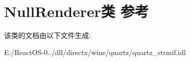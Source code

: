 \hypertarget{class_null_renderer}{}\section{Null\+Renderer类 参考}
\label{class_null_renderer}


该类的文档由以下文件生成\+:\begin{DoxyCompactItemize}
\item 
E\+:/\+React\+O\+S-\/0../dll/directx/wine/quartz/quartz\+\_\+strmif.\+idl\end{DoxyCompactItemize}
